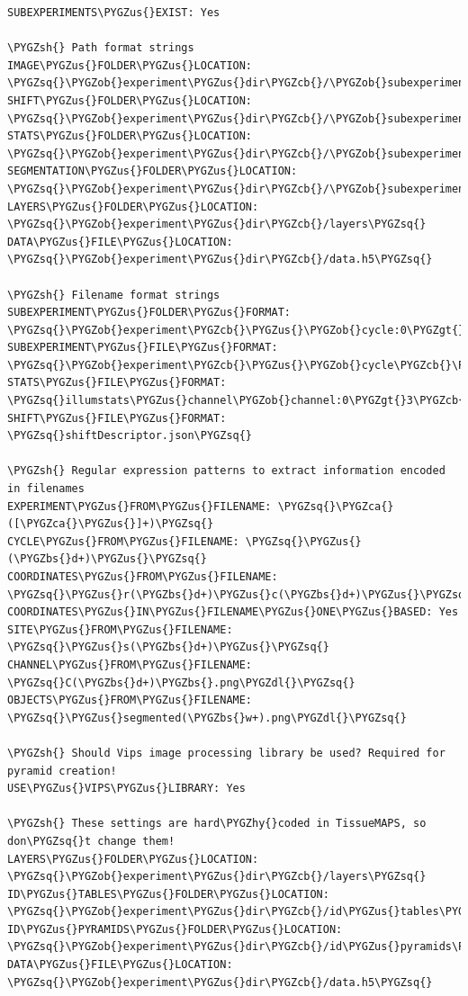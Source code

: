 \documentclass[letterpaper,10pt,english]{sphinxmanual}
\def\PYGZbs{\char`\\}
\def\PYGZus{\char`\_}
\def\PYGZob{\char`\{}
\def\PYGZcb{\char`\}}
\def\PYGZca{\char`\^}
\def\PYGZgt{\char`\>}
\def\PYGZsh{\char`\#}
\def\PYGZdl{\char`\$}
\def\PYGZhy{\char`\-}
\def\PYGZsq{\char`\'}
\renewcommand\PYGZsq{\textquotesingle}
\begin{document}
\begin{Verbatim}[commandchars=\\\{\}]
SUBEXPERIMENTS\PYGZus{}EXIST: Yes

\PYGZsh{} Path format strings
IMAGE\PYGZus{}FOLDER\PYGZus{}LOCATION: \PYGZsq{}\PYGZob{}experiment\PYGZus{}dir\PYGZcb{}/\PYGZob{}subexperiment\PYGZcb{}/images\PYGZsq{}
SHIFT\PYGZus{}FOLDER\PYGZus{}LOCATION: \PYGZsq{}\PYGZob{}experiment\PYGZus{}dir\PYGZcb{}/\PYGZob{}subexperiment\PYGZcb{}/shift\PYGZsq{}
STATS\PYGZus{}FOLDER\PYGZus{}LOCATION: \PYGZsq{}\PYGZob{}experiment\PYGZus{}dir\PYGZcb{}/\PYGZob{}subexperiment\PYGZcb{}/stats\PYGZsq{}
SEGMENTATION\PYGZus{}FOLDER\PYGZus{}LOCATION: \PYGZsq{}\PYGZob{}experiment\PYGZus{}dir\PYGZcb{}/\PYGZob{}subexperiment\PYGZcb{}/segmentations\PYGZsq{}
LAYERS\PYGZus{}FOLDER\PYGZus{}LOCATION: \PYGZsq{}\PYGZob{}experiment\PYGZus{}dir\PYGZcb{}/layers\PYGZsq{}
DATA\PYGZus{}FILE\PYGZus{}LOCATION: \PYGZsq{}\PYGZob{}experiment\PYGZus{}dir\PYGZcb{}/data.h5\PYGZsq{}

\PYGZsh{} Filename format strings
SUBEXPERIMENT\PYGZus{}FOLDER\PYGZus{}FORMAT: \PYGZsq{}\PYGZob{}experiment\PYGZcb{}\PYGZus{}\PYGZob{}cycle:0\PYGZgt{}2\PYGZcb{}\PYGZsq{}
SUBEXPERIMENT\PYGZus{}FILE\PYGZus{}FORMAT: \PYGZsq{}\PYGZob{}experiment\PYGZcb{}\PYGZus{}\PYGZob{}cycle\PYGZcb{}\PYGZsq{}
STATS\PYGZus{}FILE\PYGZus{}FORMAT: \PYGZsq{}illumstats\PYGZus{}channel\PYGZob{}channel:0\PYGZgt{}3\PYGZcb{}.h5\PYGZsq{}
SHIFT\PYGZus{}FILE\PYGZus{}FORMAT: \PYGZsq{}shiftDescriptor.json\PYGZsq{}

\PYGZsh{} Regular expression patterns to extract information encoded in filenames
EXPERIMENT\PYGZus{}FROM\PYGZus{}FILENAME: \PYGZsq{}\PYGZca{}([\PYGZca{}\PYGZus{}]+)\PYGZsq{}
CYCLE\PYGZus{}FROM\PYGZus{}FILENAME: \PYGZsq{}\PYGZus{}(\PYGZbs{}d+)\PYGZus{}\PYGZsq{}
COORDINATES\PYGZus{}FROM\PYGZus{}FILENAME: \PYGZsq{}\PYGZus{}r(\PYGZbs{}d+)\PYGZus{}c(\PYGZbs{}d+)\PYGZus{}\PYGZsq{}
COORDINATES\PYGZus{}IN\PYGZus{}FILENAME\PYGZus{}ONE\PYGZus{}BASED: Yes
SITE\PYGZus{}FROM\PYGZus{}FILENAME: \PYGZsq{}\PYGZus{}s(\PYGZbs{}d+)\PYGZus{}\PYGZsq{}
CHANNEL\PYGZus{}FROM\PYGZus{}FILENAME: \PYGZsq{}C(\PYGZbs{}d+)\PYGZbs{}.png\PYGZdl{}\PYGZsq{}
OBJECTS\PYGZus{}FROM\PYGZus{}FILENAME: \PYGZsq{}\PYGZus{}segmented(\PYGZbs{}w+).png\PYGZdl{}\PYGZsq{}

\PYGZsh{} Should Vips image processing library be used? Required for pyramid creation!
USE\PYGZus{}VIPS\PYGZus{}LIBRARY: Yes

\PYGZsh{} These settings are hard\PYGZhy{}coded in TissueMAPS, so don\PYGZsq{}t change them!
LAYERS\PYGZus{}FOLDER\PYGZus{}LOCATION: \PYGZsq{}\PYGZob{}experiment\PYGZus{}dir\PYGZcb{}/layers\PYGZsq{}
ID\PYGZus{}TABLES\PYGZus{}FOLDER\PYGZus{}LOCATION: \PYGZsq{}\PYGZob{}experiment\PYGZus{}dir\PYGZcb{}/id\PYGZus{}tables\PYGZsq{}
ID\PYGZus{}PYRAMIDS\PYGZus{}FOLDER\PYGZus{}LOCATION: \PYGZsq{}\PYGZob{}experiment\PYGZus{}dir\PYGZcb{}/id\PYGZus{}pyramids\PYGZsq{}
DATA\PYGZus{}FILE\PYGZus{}LOCATION: \PYGZsq{}\PYGZob{}experiment\PYGZus{}dir\PYGZcb{}/data.h5\PYGZsq{}
\end{Verbatim}
\end{document}
